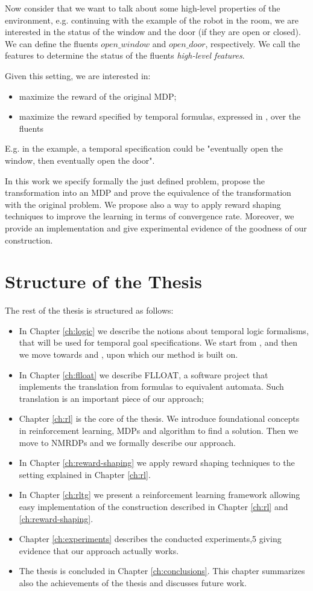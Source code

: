 Now consider that we want to talk about some high-level properties of the environment, e.g. continuing with the example of the robot in the room, we are interested in the status of the window and the door (if they are open or closed). We can define the fluents $open\_window$ and $open\_door$, respectively. We call the features to determine the status of the fluents \emph{high-level features}.

Given this setting, we are interested in:
\begin{itemize}
	\item maximize the reward of the original MDP;
	\item maximize the reward specified by temporal formulas, expressed in \LLf, over the fluents 
\end{itemize}
E.g. in the example, a temporal specification could be "eventually open the window, then eventually open the door". 

In this work we specify formally the just defined problem, propose the transformation into an MDP and prove the equivalence of the transformation with the original problem. We propose also a way to apply reward shaping techniques to improve the learning in terms of convergence rate. Moreover, we provide an implementation and give experimental evidence of the goodness of our construction.

\section{Structure of the Thesis}
The rest of the thesis is structured as follows:
\begin{itemize}
	\item In Chapter \ref{ch:logic} we describe the notions about temporal logic formalisms, that will be used for temporal goal specifications. We start from \LTL, \REGEX and then we move towards \LTLf and \LDLf, upon which our method is built on.
	\item In Chapter \ref{ch:flloat} we describe FLLOAT, a software project that implements the translation from \LLf formulas to equivalent automata. Such translation is an important piece of our approach;
	\item Chapter \ref{ch:rl} is the core of the thesis. We introduce foundational concepts in reinforcement learning, MDPs and algorithm to find a solution. Then we move to NMRDPs and we formally describe our approach.
	\item In Chapter \ref{ch:reward-shaping} we apply reward shaping techniques to the setting explained in Chapter \ref{ch:rl}.
	\item In Chapter \ref{ch:rltg} we present a reinforcement learning framework allowing easy implementation of the construction described in Chapter \ref{ch:rl} and \ref{ch:reward-shaping}.
	\item Chapter \ref{ch:experiments} describes the conducted experiments,5 giving evidence that our approach actually works.
	\item The thesis is concluded in Chapter \ref{ch:conclusions}. This chapter summarizes also the achievements of
	the thesis and discusses future work.
\end{itemize}
